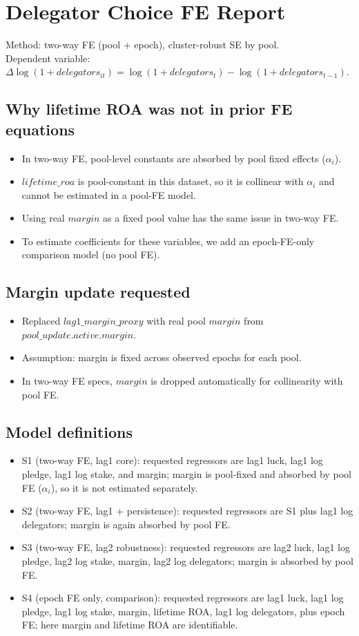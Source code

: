 \documentclass[11pt]{article}
\begin{document}
\section*{Delegator Choice FE Report}
Method: two-way FE (pool + epoch), cluster-robust SE by pool.\\
Dependent variable: $\Delta\log(1+delegators_{it}) = \log(1+delegators_t)-\log(1+delegators_{t-1})$.
\subsection*{Why lifetime ROA was not in prior FE equations}
\begin{itemize}
\item In two-way FE, pool-level constants are absorbed by pool fixed effects ($\alpha_i$).
\item $lifetime\_roa$ is pool-constant in this dataset, so it is collinear with $\alpha_i$ and cannot be estimated in a pool-FE model.
\item Using real $margin$ as a fixed pool value has the same issue in two-way FE.
\item To estimate coefficients for these variables, we add an epoch-FE-only comparison model (no pool FE).
\end{itemize}
\subsection*{Margin update requested}
\begin{itemize}
\item Replaced $lag1\_margin\_proxy$ with real pool $margin$ from $pool\_update.active.margin$.
\item Assumption: margin is fixed across observed epochs for each pool.
\item In two-way FE specs, $margin$ is dropped automatically for collinearity with pool FE.
\end{itemize}
\subsection*{Model definitions}
\begin{itemize}
\item S1 (two-way FE, lag1 core): requested regressors are lag1 luck, lag1 log pledge, lag1 log stake, and margin; margin is pool-fixed and absorbed by pool FE ($\alpha_i$), so it is not estimated separately.
\item S2 (two-way FE, lag1 + persistence): requested regressors are S1 plus lag1 log delegators; margin is again absorbed by pool FE.
\item S3 (two-way FE, lag2 robustness): requested regressors are lag2 luck, lag1 log pledge, lag2 log stake, margin, lag2 log delegators; margin is absorbed by pool FE.
\item S4 (epoch FE only, comparison): requested regressors are lag1 luck, lag1 log pledge, lag1 log stake, margin, lifetime ROA, lag1 log delegators, plus epoch FE; here margin and lifetime ROA are identifiable.
\end{itemize}
\end{document}
